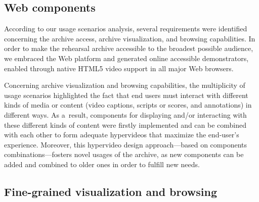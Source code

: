 \documentclass[conference]{IEEEtran}
\newcommand{\todo}[1]{\noindent\textcolor{red}{{\bf \{ToDo} #1{\bf \}}}}
\begin{document}
%
%



\subsection{Web components}
According to our usage scenarios analysis, several requirements were identified concerning the archive access, archive visualization, and browsing capabilities. In order to make the rehearsal archive accessible to the broadest possible audience, we embraced the Web platform and generated online accessible demonstrators, enabled through native HTML5 video support in all major Web browsers.

Concerning archive visualization and browsing capabilities, the multiplicity of usage scenarios highlighted the fact that end users must interact with different kinds of media or content (video captions, scripts or scores, and annotations) in different ways. As a~result, components for displaying and/or interacting with these different kinds of content were firstly implemented and can be combined with each other to form adequate hypervideos that maximize the end-user's experience. Moreover, this hypervideo design approach---based on components combinations---fosters novel usages of the archive, as new components can be added and combined to older ones in order to fulfill new needs.

\subsection{Fine-grained visualization and browsing}
\end{document}
